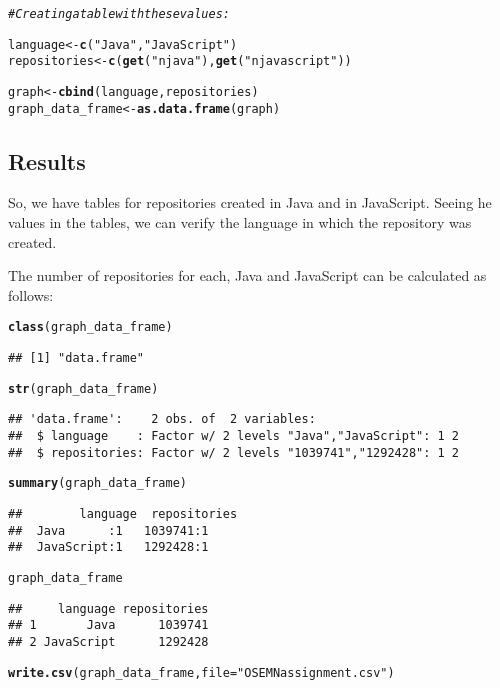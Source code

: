 \documentclass{article}\usepackage[]{graphicx}\usepackage[]{color}
\makeatletter
\newcommand{\hlstr}[1]{\textcolor[rgb]{0.192,0.494,0.8}{#1}}%
\newcommand{\hlcom}[1]{\textcolor[rgb]{0.678,0.584,0.686}{\textit{#1}}}%
\newcommand{\hlstd}[1]{\textcolor[rgb]{0.345,0.345,0.345}{#1}}%
\newcommand{\hlkwb}[1]{\textcolor[rgb]{0.69,0.353,0.396}{#1}}%
\newcommand{\hlkwc}[1]{\textcolor[rgb]{0.333,0.667,0.333}{#1}}%
\newcommand{\hlkwd}[1]{\textcolor[rgb]{0.737,0.353,0.396}{\textbf{#1}}}%
\newenvironment{kframe}{%
 \def\at@end@of@kframe{}%
 \ifinner\ifhmode%
  \def\at@end@of@kframe{\end{minipage}}%
  \begin{minipage}{\columnwidth}%
 \fi\fi%
 \def\FrameCommand##1{\hskip\@totalleftmargin \hskip-\fboxsep
 \colorbox{shadecolor}{##1}\hskip-\fboxsep
     \hskip-\linewidth \hskip-\@totalleftmargin \hskip\columnwidth}%
 \MakeFramed {\advance\hsize-\width
   \@totalleftmargin\z@ \linewidth\hsize
   \@setminipage}}%
 {\par\unskip\endMakeFramed%
 \at@end@of@kframe}
\newenvironment{knitrout}{}{} %
\makeatother
\begin{document}
\begin{knitrout}
\begin{kframe}
\begin{alltt}
\hlcom{# Creating a table with these values:}

\hlstd{language} \hlkwb{<-} \hlkwd{c}\hlstd{(}\hlstr{"Java"}\hlstd{,} \hlstr{"JavaScript"}\hlstd{)}
\hlstd{repositories} \hlkwb{<-} \hlkwd{c}\hlstd{(}\hlkwd{get}\hlstd{(}\hlstr{"njava"}\hlstd{),} \hlkwd{get}\hlstd{(}\hlstr{"njavascript"}\hlstd{))}

\hlstd{graph} \hlkwb{<-} \hlkwd{cbind}\hlstd{(language, repositories)}
\hlstd{graph_data_frame} \hlkwb{<-} \hlkwd{as.data.frame}\hlstd{(graph)}
\end{alltt}
\end{kframe}
\end{knitrout}

\subsection*{Results}
So, we have tables for repositories created in Java and in JavaScript. Seeing he values in the tables, we can verify the language in which the repository was created. \par
The number of repositories for each, Java and JavaScript can be calculated as follows:

\begin{knitrout}
\color{fgcolor}\begin{kframe}
\begin{alltt}
\hlkwd{class}\hlstd{(graph_data_frame)}
\end{alltt}
\begin{verbatim}
## [1] "data.frame"
\end{verbatim}
\begin{alltt}
\hlkwd{str}\hlstd{(graph_data_frame)}
\end{alltt}
\begin{verbatim}
## 'data.frame':	2 obs. of  2 variables:
##  $ language    : Factor w/ 2 levels "Java","JavaScript": 1 2
##  $ repositories: Factor w/ 2 levels "1039741","1292428": 1 2
\end{verbatim}
\begin{alltt}
\hlkwd{summary}\hlstd{(graph_data_frame)}
\end{alltt}
\begin{verbatim}
##        language  repositories
##  Java      :1   1039741:1    
##  JavaScript:1   1292428:1
\end{verbatim}
\begin{alltt}
\hlstd{graph_data_frame}
\end{alltt}
\begin{verbatim}
##     language repositories
## 1       Java      1039741
## 2 JavaScript      1292428
\end{verbatim}
\begin{alltt}
\hlkwd{write.csv}\hlstd{(graph_data_frame,}\hlkwc{file}\hlstd{=}\hlstr{"OSEMNassignment.csv"}\hlstd{)}
\end{alltt}
\end{kframe}
\end{knitrout}
\end{document}
